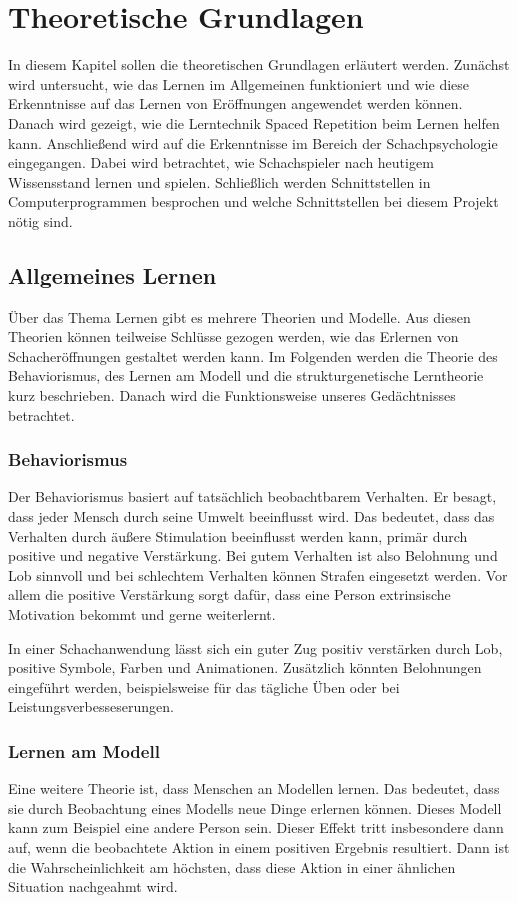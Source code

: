 
\chapter{Theoretische Grundlagen}
In diesem Kapitel sollen die theoretischen Grundlagen erläutert werden. Zunächst wird untersucht, wie das Lernen im Allgemeinen funktioniert und wie diese Erkenntnisse auf das Lernen von Eröffnungen angewendet werden können. Danach wird gezeigt, wie die Lerntechnik Spaced Repetition beim Lernen helfen kann.
Anschließend wird auf die Erkenntnisse im Bereich der Schachpsychologie eingegangen. Dabei wird betrachtet, wie Schachspieler nach heutigem Wissensstand lernen und spielen. Schließlich werden Schnittstellen in Computerprogrammen besprochen und welche Schnittstellen bei diesem Projekt nötig sind.

\section{Allgemeines Lernen}
Über das Thema Lernen gibt es mehrere Theorien und Modelle. Aus diesen Theorien können teilweise Schlüsse gezogen werden, wie das Erlernen von Schacheröffnungen gestaltet werden kann.
Im Folgenden werden die Theorie des Behaviorismus, des Lernen am Modell und die strukturgenetische Lerntheorie kurz beschrieben.
Danach wird die Funktionsweise unseres Gedächtnisses betrachtet.

\subsection{Behaviorismus}
Der Behaviorismus basiert auf tatsächlich beobachtbarem Verhalten. Er besagt, dass jeder Mensch durch seine Umwelt beeinflusst wird. Das bedeutet, dass das Verhalten durch äußere Stimulation beeinflusst werden kann, primär durch positive und negative Verstärkung. Bei gutem Verhalten ist also Belohnung und Lob sinnvoll und bei schlechtem Verhalten können Strafen eingesetzt werden. Vor allem die positive Verstärkung sorgt dafür, dass eine Person extrinsische Motivation bekommt und gerne weiterlernt.
\cite{kron_grundwissen_2024}

In einer Schachanwendung lässt sich ein guter Zug positiv verstärken durch Lob, positive Symbole, Farben und Animationen.
Zusätzlich könnten Belohnungen eingeführt werden, beispielsweise für das tägliche Üben oder bei Leistungsverbesseserungen.

\subsection{Lernen am Modell}
Eine weitere Theorie ist, dass Menschen an Modellen lernen. Das bedeutet, dass sie durch Beobachtung eines Modells neue Dinge erlernen können. Dieses Modell kann zum Beispiel eine andere Person sein.
Dieser Effekt tritt insbesondere dann auf, wenn die beobachtete Aktion in einem positiven Ergebnis resultiert. Dann ist die Wahrscheinlichkeit am höchsten, dass diese Aktion in einer ähnlichen Situation nachgeahmt wird.
\cite{kron_grundwissen_2024}


